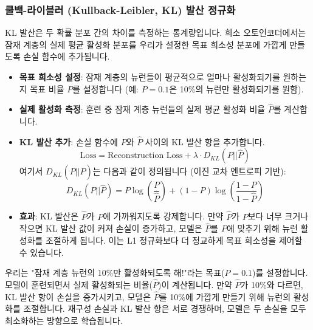 \documentclass[11pt,a4paper]{article}
\begin{document}
\subsubsection{쿨백-라이블러 (Kullback-Leibler, KL) 발산 정규화}
KL 발산은 두 확률 분포 간의 차이를 측정하는 통계량입니다. 희소 오토인코더에서는 잠재 계층의 실제 평균 활성화 분포를 우리가 설정한 목표 희소성 분포에 가깝게 만들도록 손실 함수에 추가됩니다.

\begin{itemize}
    \item \textbf{목표 희소성 설정}: 잠재 계층의 뉴런들이 평균적으로 얼마나 활성화되기를 원하는지 목표 비율 $P$를 설정합니다 (예: $P=0.1$은 10\%의 뉴런만 활성화되기를 원함).
    \item \textbf{실제 활성화 측정}: 훈련 중 잠재 계층 뉴런들의 실제 평균 활성화 비율 $\hat{P}$를 계산합니다.
    \item \textbf{KL 발산 추가}: 손실 함수에 $P$와 $\hat{P}$ 사이의 KL 발산 항을 추가합니다.
        \begin{equation*}
        \text{Loss} = \text{Reconstruction Loss} + \lambda \cdot D_{KL}(P || \hat{P})
        \end{equation*}
        여기서 $D_{KL}(P || \hat{P})$는 다음과 같이 정의됩니다 (이진 교차 엔트로피 기반):
        \begin{equation*}
        D_{KL}(P || \hat{P}) = P \log\left(\frac{P}{\hat{P}}\right) + (1-P) \log\left(\frac{1-P}{1-\hat{P}}\right)
        \end{equation*}
    \item \textbf{효과}: KL 발산은 $\hat{P}$가 $P$에 가까워지도록 강제합니다. 만약 $\hat{P}$가 $P$보다 너무 크거나 작으면 KL 발산 값이 커져 손실이 증가하고, 모델은 $\hat{P}$를 $P$에 맞추기 위해 뉴런 활성화를 조절하게 됩니다. 이는 L1 정규화보다 더 정교하게 목표 희소성을 제어할 수 있습니다.
\end{itemize}

\begin{tcolorbox}[title=\textbf{KL 발산의 직관적 이해}]
우리는 "잠재 계층 뉴런의 10\%만 활성화되도록 해!"라는 목표($P=0.1$)를 설정합니다. 모델이 훈련되면서 실제 활성화되는 비율($\hat{P}$)이 계산됩니다. 만약 $\hat{P}$가 10\%와 다르면, KL 발산 항이 손실을 증가시키고, 모델은 $\hat{P}$를 10\%에 가깝게 만들기 위해 뉴런의 활성화를 조절합니다. 재구성 손실과 KL 발산 항은 서로 경쟁하며, 모델은 두 손실을 모두 최소화하는 방향으로 학습됩니다.
\end{tcolorbox}
\end{document}
